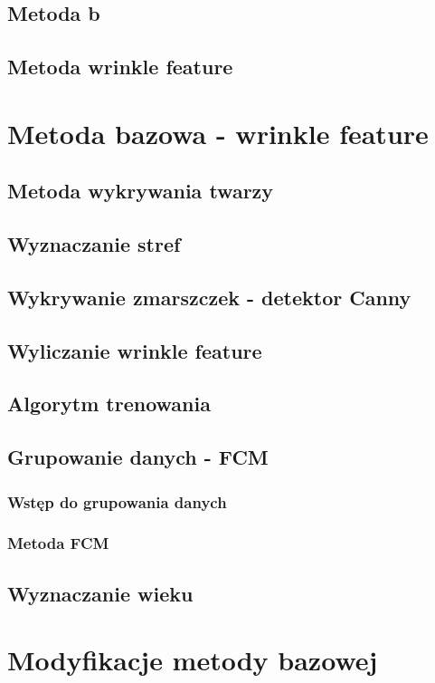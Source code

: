 \documentclass[a4paper,twoside,12pt]{book}
\begin{document}
\section{Metoda b}
\section{Metoda wrinkle feature}

\chapter{Metoda bazowa - wrinkle feature}

\section{Metoda wykrywania twarzy}
\section{Wyznaczanie stref}
\section{Wykrywanie zmarszczek - detektor Canny}
\section{Wyliczanie wrinkle feature}
\section{Algorytm trenowania}
\section{Grupowanie danych - FCM}

\subsection{Wstęp do grupowania danych}
\subsection{Metoda FCM}

\section{Wyznaczanie wieku}


\chapter{Modyfikacje metody bazowej}
\end{document}
